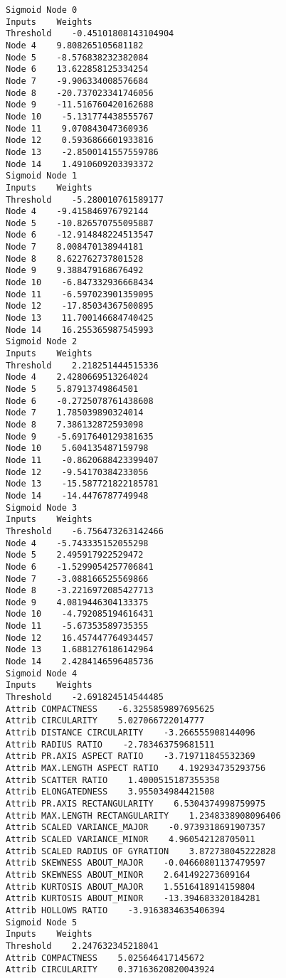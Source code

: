 \documentclass[
	article,			%
	11pt,				%
	oneside,			%
	a4paper,			%
	english,			%
	brazil,				%
	sumario=tradicional
	]{abntex2}
\begin{document}
\begin{lstlisting}
Sigmoid Node 0
Inputs    Weights
Threshold    -0.45101808143104904
Node 4    9.808265105681182
Node 5    -8.576838232382084
Node 6    13.622858125334254
Node 7    -9.906334008576684
Node 8    -20.737023341746056
Node 9    -11.516760420162688
Node 10    -5.131774438555767
Node 11    9.070843047360936
Node 12    0.5936866601933816
Node 13    -2.8500141557559786
Node 14    1.4910609203393372
Sigmoid Node 1
Inputs    Weights
Threshold    -5.280010761589177
Node 4    -9.415846976792144
Node 5    -10.826570755095887
Node 6    -12.914848224513547
Node 7    8.008470138944181
Node 8    8.622762737801528
Node 9    9.388479168676492
Node 10    -6.847332936668434
Node 11    -6.597023901359095
Node 12    -17.85034367500895
Node 13    11.700146684740425
Node 14    16.255365987545993
Sigmoid Node 2
Inputs    Weights
Threshold    2.218251444515336
Node 4    2.4280669513264024
Node 5    5.87913749864501
Node 6    -0.2725078761438608
Node 7    1.785039890324014
Node 8    7.386132872593098
Node 9    -5.6917640129381635
Node 10    5.604135487159798
Node 11    -0.8620688423399407
Node 12    -9.54170384233056
Node 13    -15.587721822185781
Node 14    -14.4476787749948
Sigmoid Node 3
Inputs    Weights
Threshold    -6.756473263142466
Node 4    -5.743335152055298
Node 5    2.495917922529472
Node 6    -1.5299054257706841
Node 7    -3.088166525569866
Node 8    -3.2216972085427713
Node 9    4.0819446304133375
Node 10    -4.792085194616431
Node 11    -5.67353589735355
Node 12    16.457447764934457
Node 13    1.6881276186142964
Node 14    2.4284146596485736
Sigmoid Node 4
Inputs    Weights
Threshold    -2.691824514544485
Attrib COMPACTNESS    -6.3255859897695625
Attrib CIRCULARITY    5.027066722014777
Attrib DISTANCE CIRCULARITY    -3.266555908144096
Attrib RADIUS RATIO    -2.783463759681511
Attrib PR.AXIS ASPECT RATIO    -3.719711845532369
Attrib MAX.LENGTH ASPECT RATIO    4.192934735293756
Attrib SCATTER RATIO    1.4000515187355358
Attrib ELONGATEDNESS    3.955034984421508
Attrib PR.AXIS RECTANGULARITY    6.5304374998759975
Attrib MAX.LENGTH RECTANGULARITY    1.2348338908096406
Attrib SCALED VARIANCE_MAJOR    -0.9739318691907357
Attrib SCALED VARIANCE_MINOR    4.960542128705011
Attrib SCALED RADIUS OF GYRATION    3.872738045222828
Attrib SKEWNESS ABOUT_MAJOR    -0.04660801137479597
Attrib SKEWNESS ABOUT_MINOR    2.641492273609164
Attrib KURTOSIS ABOUT_MAJOR    1.5516418914159804
Attrib KURTOSIS ABOUT_MINOR    -13.394683320184281
Attrib HOLLOWS RATIO    -3.9163834635406394
Sigmoid Node 5
Inputs    Weights
Threshold    2.247632345218041
Attrib COMPACTNESS    5.025646417145672
Attrib CIRCULARITY    0.37163620820043924

\end{lstlisting}
\end{document}
